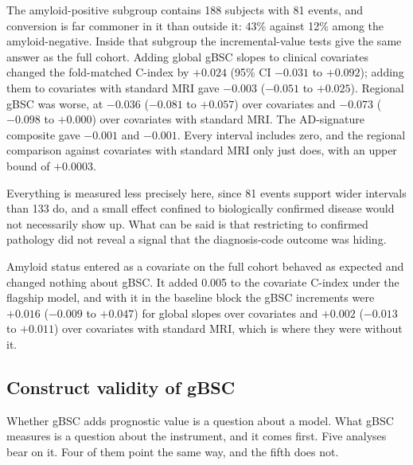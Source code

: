 \documentclass[blue]{ludusofficial}  %
\begin{document}
The amyloid-positive subgroup contains 188 subjects with 81 events, and conversion is far commoner in it than outside it: 43\% against 12\% among the amyloid-negative. Inside that subgroup the incremental-value tests give the same answer as the full cohort. Adding global gBSC slopes to clinical covariates changed the fold-matched C-index by $+0.024$ (95\% CI $-0.031$ to $+0.092$); adding them to covariates with standard MRI gave $-0.003$ ($-0.051$ to $+0.025$). Regional gBSC was worse, at $-0.036$ ($-0.081$ to $+0.057$) over covariates and $-0.073$ ($-0.098$ to $+0.000$) over covariates with standard MRI. The AD-signature composite gave $-0.001$ and $-0.001$. Every interval includes zero, and the regional comparison against covariates with standard MRI only just does, with an upper bound of $+0.0003$.

Everything is measured less precisely here, since 81 events support wider intervals than 133 do, and a small effect confined to biologically confirmed disease would not necessarily show up. What can be said is that restricting to confirmed pathology did not reveal a signal that the diagnosis-code outcome was hiding.

Amyloid status entered as a covariate on the full cohort behaved as expected and changed nothing about gBSC. It added 0.005 to the covariate C-index under the flagship model, and with it in the baseline block the gBSC increments were $+0.016$ ($-0.009$ to $+0.047$) for global slopes over covariates and $+0.002$ ($-0.013$ to $+0.011$) over covariates with standard MRI, which is where they were without it.

\subsection{Construct validity of gBSC}
\label{sec:construct}

Whether gBSC adds prognostic value is a question about a model. What gBSC measures is a question about the instrument, and it comes first. Five analyses bear on it. Four of them point the same way, and the fifth does not.
\end{document}

